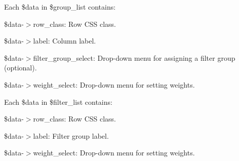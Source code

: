 Each \$data in \$group\+\_\+list contains\+:
\begin{DoxyItemize}
\item \$data-\/$>$row\+\_\+class\+: Row C\+SS class.
\item \$data-\/$>$label\+: Column label.
\item \$data-\/$>$filter\+\_\+group\+\_\+select\+: Drop-\/down menu for assigning a filter group (optional).
\item \$data-\/$>$weight\+\_\+select\+: Drop-\/down menu for setting weights.
\end{DoxyItemize}

Each \$data in \$filter\+\_\+list contains\+:
\begin{DoxyItemize}
\item \$data-\/$>$row\+\_\+class\+: Row C\+SS class.
\item \$data-\/$>$label\+: Filter group label.
\item \$data-\/$>$weight\+\_\+select\+: Drop-\/down menu for setting weights. 
\end{DoxyItemize}